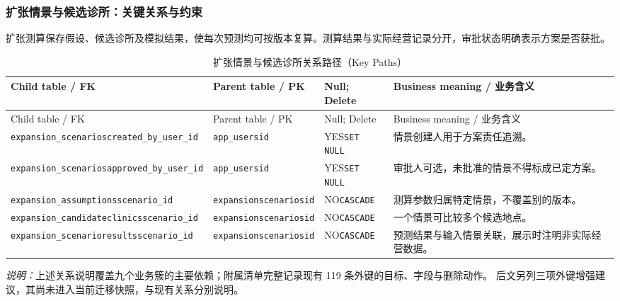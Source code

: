 \subsubsection{扩张情景与候选诊所：关键关系与约束}
扩张测算保存假设、候选诊所及模拟结果，使每次预测均可按版本复算。测算结果与实际经营记录分开，审批状态明确表示方案是否获批。

\begingroup\footnotesize\setlength{\tabcolsep}{3pt}
\begin{longtable}{@{}L{43mm}L{32mm}L{24mm}L{49mm}@{}}
\caption{扩张情景与候选诊所关系路径（Key Paths）}\label{tab:domain-key-09}\\\toprule
Child table / FK & Parent table / PK & Null; Delete & Business meaning / 业务含义\\\midrule\endfirsthead
\toprule Child table / FK & Parent table / PK & Null; Delete & Business meaning / 业务含义\\\midrule\endhead
\texttt{expansion\_scenarios}\newline\texttt{created\_by\_user\_id} & \texttt{app\_users}\newline\texttt{id} & YES\newline\texttt{SET NULL} & 情景创建人用于方案责任追溯。\\
\texttt{expansion\_scenarios}\newline\texttt{approved\_by\_user\_id} & \texttt{app\_users}\newline\texttt{id} & YES\newline\texttt{SET NULL} & 审批人可选，未批准的情景不得标成已定方案。\\
\texttt{expansion\_assumptions}\newline\texttt{scenario\_id} & \texttt{expansion}\newline\texttt{scenarios}\newline\texttt{id} & NO\newline\texttt{CASCADE} & 测算参数归属特定情景，不覆盖别的版本。\\
\texttt{expansion\_candidate}\newline\texttt{clinics}\newline\texttt{scenario\_id} & \texttt{expansion}\newline\texttt{scenarios}\newline\texttt{id} & NO\newline\texttt{CASCADE} & 一个情景可比较多个候选地点。\\
\texttt{expansion\_scenario}\newline\texttt{results}\newline\texttt{scenario\_id} & \texttt{expansion}\newline\texttt{scenarios}\newline\texttt{id} & NO\newline\texttt{CASCADE} & 预测结果与输入情景关联，展示时注明非实际经营数据。\\
\bottomrule\end{longtable}\endgroup

\noindent\emph{说明：}上述关系说明覆盖九个业务簇的主要依赖；附属清单完整记录现有 119 条外键的目标、字段与删除动作。
后文另列三项外键增强建议，其尚未进入当前迁移快照，与现有关系分别说明。
